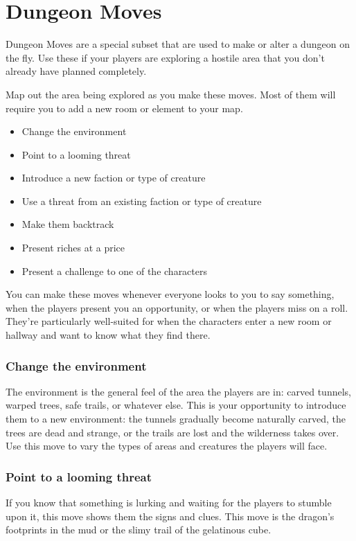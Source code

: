 \section*{Dungeon Moves}


Dungeon Moves are a special subset that are used to make or alter a dungeon on the fly. Use these if your players are exploring a hostile area that you don't already have planned completely.

Map out the area being explored as you make these moves. Most of them will require you to add a new room or element to your map.
\begin{itemize}
\item Change the environment
\item Point to a looming threat
\item Introduce a new faction or type of creature
\item Use a threat from an existing faction or type of creature
\item Make them backtrack
\item Present riches at a price
\item Present a challenge to one of the characters

\end{itemize}

You can make these moves whenever everyone looks to you to say something, when the players present you an opportunity, or when the players miss on a roll. They're particularly well-suited for when the characters enter a new room or hallway and want to know what they find there.
\subsubsection{Change the environment}

The environment is the general feel of the area the players are in: carved tunnels, warped trees, safe trails, or whatever else. This is your opportunity to introduce them to a new environment: the tunnels gradually become naturally carved, the trees are dead and strange, or the trails are lost and the wilderness takes over. Use this move to vary the types of areas and creatures the players will face.
\subsubsection{Point to a looming threat}

If you know that something is lurking and waiting for the players to stumble upon it, this move shows them the signs and clues. This move is the dragon's footprints in the mud or the slimy trail of the gelatinous cube.
